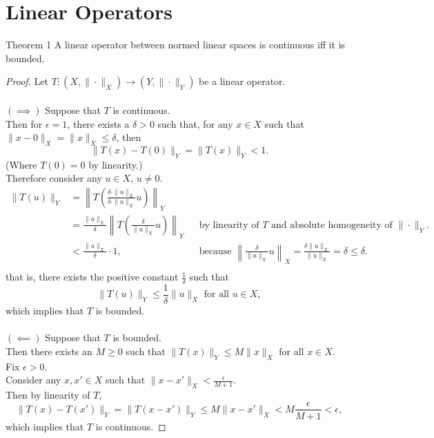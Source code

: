 \section{Linear Operators}
\begin{namedthm*}{Theorem 1}
    A linear operator between normed linear spaces is continuous iff it is bounded.    
\end{namedthm*}
\begin{proof}
    Let $T:(X,\|\cdot\|_X)\to(Y,\|\cdot\|_Y)$ be a linear operator.\\
    \\$(\implies)$ Suppose that $T$ is continuous.
    \\Then for $\epsilon=1$, there exists a $\delta>0$ such that, for any $x\in X$ such that $\|x-0\|_X=\|x\|_X\le\delta$, then
    \[
        \|T(x)-T(0)\|_Y=\|T(x)\|_Y<1.
    \]
    (Where $T(0)=0$ by linearity.)
    \\Therefore consider any $u\in X$, $u\neq0$.
    \begin{align*}
        \|T(u)\|_Y&=\left\|T\left(\frac{\delta\cdot\|u\|_X}{\delta\cdot\|u\|_X}u\right)\right\|_Y\\
        &=\frac{\|u\|_X}{\delta}\left\|T\left(\frac{\delta}{\|u\|_X}u\right)\right\|_Y&&\text{by linearity of $T$ and absolute homogeneity of $\|\cdot\|_Y$.}\\
        &<\frac{\|u\|_X}{\delta}\cdot1,&&\text{because }\left\|\frac{\delta}{\|u\|_X}u\right\|_X=\frac{\delta\|u\|_X}{\|u\|_X}=\delta\le\delta.\\
    \end{align*}
    that is, there exists the positive constant $\frac{1}{\delta}$ such that 
    \[
        \|T(u)\|_Y\le\frac{1}{\delta}\|u\|_X\text{ for all }u\in X,
    \]
    which implies that $T$ is bounded.\\
    \\$(\impliedby)$ Suppose that $T$ is bounded.
    \\Then there exists an $M\ge0$ such that 
    $
        \|T(x)\|_Y\le M\|x\|_X\text{ for all }x\in X.
    $
    \\Fix $\epsilon>0$.
    \\Consider any $x,x'\in X$ such that $\|x-x'\|_X<\frac{\epsilon}{M+1}$.
    \\Then by linearity of $T$,
    \[
        \|T(x)-T(x')\|_Y=\|T(x-x')\|_Y\le M\|x-x'\|_X<M\frac{\epsilon}{M+1}<\epsilon,
    \]
    which implies that $T$ is continuous.
\end{proof}

